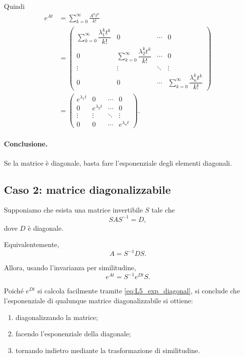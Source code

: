 Quindi
\begin{align}
e^{At}
&=
\sum_{k=0}^{\infty}\frac{A^k t^k}{k!}\nonumber\\
&=
\begin{pmatrix}
\sum_{k=0}^{\infty}\dfrac{\lambda_1^k t^k}{k!} & 0 & \cdots & 0\\
0 & \sum_{k=0}^{\infty}\dfrac{\lambda_2^k t^k}{k!} & \cdots & 0\\
\vdots & \vdots & \ddots & \vdots\\
0 & 0 & \cdots & \sum_{k=0}^{\infty}\dfrac{\lambda_n^k t^k}{k!}
\end{pmatrix}\nonumber\\
&=
\begin{pmatrix}
e^{\lambda_1 t} & 0 & \cdots & 0\\
0 & e^{\lambda_2 t} & \cdots & 0\\
\vdots & \vdots & \ddots & \vdots\\
0 & 0 & \cdots & e^{\lambda_n t}
\end{pmatrix}.
\label{eq:L5_exp_diagonal}
\end{align}

\paragraph{Conclusione.}
Se la matrice è diagonale, basta fare l'esponenziale degli elementi diagonali.

\subsection{Caso 2: matrice diagonalizzabile}

Supponiamo che esista una matrice invertibile $S$ tale che
\[
SAS^{-1}=D,
\]
dove $D$ è diagonale.

Equivalentemente,
\[
A=S^{-1}DS.
\]

Allora, usando l'invarianza per similitudine,
\begin{equation}
e^{At}=S^{-1}e^{Dt}S.
\label{eq:L5_exp_diagonalizable}
\end{equation}

Poiché $e^{Dt}$ si calcola facilmente tramite \eqref{eq:L5_exp_diagonal}, si conclude che l'esponenziale di qualunque matrice diagonalizzabile si ottiene:
\begin{enumerate}
    \item diagonalizzando la matrice;
    \item facendo l'esponenziale della diagonale;
    \item tornando indietro mediante la trasformazione di similitudine.
\end{enumerate}


